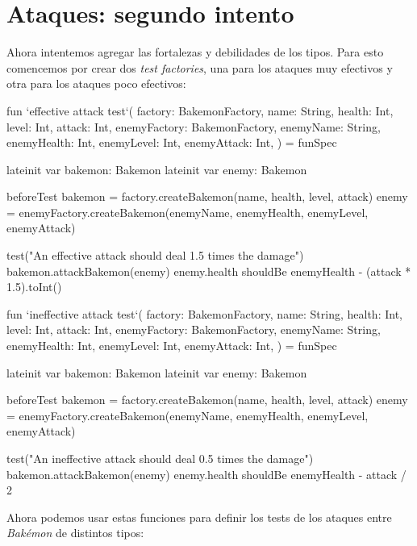 \section{Ataques: segundo intento}
  Ahora intentemos agregar las fortalezas y debilidades de los tipos.
  Para esto comencemos por crear dos \textit{test factories}, una para los ataques muy efectivos y
  otra para los ataques poco efectivos:

  \begin{kotlin}
    fun `effective attack test`(
      factory: BakemonFactory,
      name: String,
      health: Int,
      level: Int,
      attack: Int,
      enemyFactory: BakemonFactory,
      enemyName: String,
      enemyHealth: Int,
      enemyLevel: Int,
      enemyAttack: Int,
    ) = funSpec {
      lateinit var bakemon: Bakemon
      lateinit var enemy: Bakemon

      beforeTest {
        bakemon = factory.createBakemon(name, health, level, attack)
        enemy = enemyFactory.createBakemon(enemyName, enemyHealth, enemyLevel, enemyAttack)
      }

      test("An effective attack should deal 1.5 times the damage") {
        bakemon.attackBakemon(enemy)
        enemy.health shouldBe enemyHealth - (attack * 1.5).toInt()
      }
    }
  \end{kotlin}

  \begin{kotlin}
    fun `ineffective attack test`(
      factory: BakemonFactory,
      name: String,
      health: Int,
      level: Int,
      attack: Int,
      enemyFactory: BakemonFactory,
      enemyName: String,
      enemyHealth: Int,
      enemyLevel: Int,
      enemyAttack: Int,
    ) = funSpec {
      lateinit var bakemon: Bakemon
      lateinit var enemy: Bakemon

      beforeTest {
        bakemon = factory.createBakemon(name, health, level, attack)
        enemy = enemyFactory.createBakemon(enemyName, enemyHealth, enemyLevel, enemyAttack)
      }

      test("An ineffective attack should deal 0.5 times the damage") {
        bakemon.attackBakemon(enemy)
        enemy.health shouldBe enemyHealth - attack / 2
      }
    }
  \end{kotlin}

  Ahora podemos usar estas funciones para definir los tests de los ataques entre \textit{Bakémon}
  de distintos tipos:

